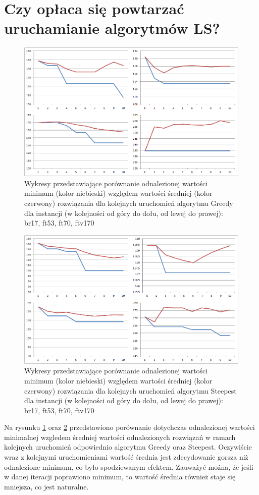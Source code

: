 \section{Czy opłaca się powtarzać uruchamianie algorytmów LS?}
\begin{figure}[!h]
\centering\includegraphics[width=12cm]{img/min_vs_avg_g.png}
\caption{Wykresy przedstawiające porównanie odnalezionej wartości minimum (kolor niebieski) względem wartości średniej (kolor czerwony) rozwiązania dla kolejnych uruchomień algorytmu Greedy dla instancji (w kolejności od góry do dołu, od lewej do prawej): br17, ft53, ft70, ftv170}\label{rys:mvsag}
\end{figure}
\begin{figure}[!h]
\centering\includegraphics[width=12cm]{img/min_vs_avg_s.png}
\caption{Wykresy przedstawiające porównanie odnalezionej wartości minimum (kolor niebieski) względem wartości średniej (kolor czerwony) rozwiązania dla kolejnych uruchomień algorytmu Steepest dla instancji (w kolejności od góry do dołu, od lewej do prawej): br17, ft53, ft70, ftv170}\label{rys:mvsas}
\end{figure}

Na rysunku \ref{rys:mvsag} oraz \ref{rys:mvsas} przedstawiono porównanie dotychczas odnalezionej wartości minimalnej wzgledem średniej wartości odnalezionych rozwiązań w ramach kolejnych uruchomień odpowiednio algorytmu Greedy oraz Steepest. Oczywiście wraz z kolejnymi uruchomieniami wartość średnia jest zdecydowanie gorsza niż odnalezione minimum, co było spodziewanym efektem. Zauważyć można, że jeśli w danej iteracji poprawiono minimum, to wartość średnia również staje się mniejsza, co jest naturalne.

